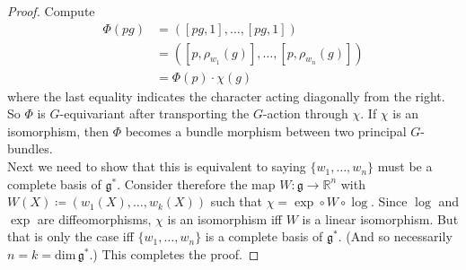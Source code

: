 \documentclass[12pt]{article}
\numberwithin{equation}{section}
\newcommand{\R}{\mathbb{R}}
\renewcommand{\dim}{\mathrm{dim}}
\begin{document}
\begin{proof}
    Compute
    \begin{equation}
    \begin{split}
        \mathsf{\Phi}(pg) &= ([pg,1],\dots,[pg,1])\\
        &= ([p,\rho_{w_1}(g)],\dots,[p,\rho_{w_n}(g)])\\
        &= \mathsf{\Phi}(p)\cdot \chi(g)
    \end{split}
    \end{equation}
    where the last equality indicates the character acting diagonally from the right. So $\mathsf{\Phi}$ is $G$-equivariant after transporting the $G$-action through $\chi$. If $\chi$ is an isomorphism, then $\mathsf{\Phi}$ becomes a bundle morphism between two principal $G$-bundles.\\
    Next we need to show that this is equivalent to saying $\{w_1,\dots,w_n\}$ must be a complete basis of $\mathfrak{g}^*$. Consider therefore the map $W\colon \mathfrak{g}\to \R^n$ with $W(X)\coloneqq (w_1(X),\dots,w_k(X))$ such that $\chi = \exp\circ W\circ \log$. Since $\log$ and $\exp$ are diffeomorphisms, $\chi$ is an isomorphism iff $W$ is a linear isomorphism. But that is only the case iff $\{w_1,\dots,w_n\}$ is a complete basis of $\mathfrak{g}^*$. (And so necessarily $n=k=\dim\,\mathfrak{g}^*$.) This completes the proof.
\end{proof}
\end{document}
